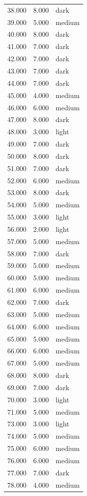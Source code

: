\begin{tabular}{lll}
38.000 & 8.000 & dark \\
39.000 & 5.000 & medium \\
40.000 & 8.000 & dark \\
41.000 & 7.000 & dark \\
42.000 & 7.000 & dark \\
43.000 & 7.000 & dark \\
44.000 & 7.000 & dark \\
45.000 & 4.000 & medium \\
46.000 & 6.000 & medium \\
47.000 & 8.000 & dark \\
48.000 & 3.000 & light \\
49.000 & 7.000 & dark \\
50.000 & 8.000 & dark \\
51.000 & 7.000 & dark \\
52.000 & 6.000 & medium \\
53.000 & 8.000 & dark \\
54.000 & 5.000 & medium \\
55.000 & 3.000 & light \\
56.000 & 2.000 & light \\
57.000 & 5.000 & medium \\
58.000 & 7.000 & dark \\
59.000 & 5.000 & medium \\
60.000 & 5.000 & medium \\
61.000 & 6.000 & medium \\
62.000 & 7.000 & dark \\
63.000 & 5.000 & medium \\
64.000 & 6.000 & medium \\
65.000 & 5.000 & medium \\
66.000 & 6.000 & medium \\
67.000 & 5.000 & medium \\
68.000 & 8.000 & dark \\
69.000 & 7.000 & dark \\
70.000 & 3.000 & light \\
71.000 & 5.000 & medium \\
73.000 & 3.000 & light \\
74.000 & 5.000 & medium \\
75.000 & 6.000 & medium \\
76.000 & 6.000 & medium \\
77.000 & 7.000 & dark \\
78.000 & 4.000 & medium \\

\end{tabular}
